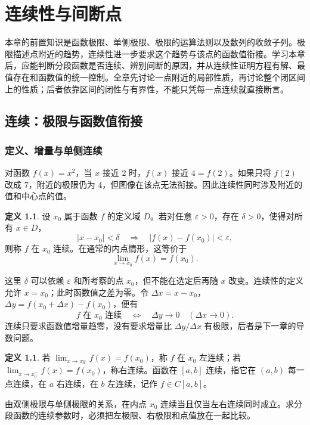 \documentclass[UTF8,fontset=fandol,12pt,oneside,openany]{ctexrep}
\theoremstyle{definition}
\newtheorem{definition}[theorem]{定义}
\begin{document}
\chapter{连续性与间断点}
\label{lec:04:chapter}

本章的前置知识是函数极限、单侧极限、极限的运算法则以及数列的收敛子列。极限描述点附近的趋势，连续性进一步要求这个趋势与该点的函数值衔接。学习本章后，应能判断分段函数是否连续、辨别间断的原因，并从连续性证明方程有解、最值存在和函数值的统一控制。全章先讨论一点附近的局部性质，再讨论整个闭区间上的性质；后者依靠区间的闭性与有界性，不能只凭每一点连续就直接断言。

\section{连续：极限与函数值衔接}
\label{lec:04:continuity}

\subsection{定义、增量与单侧连续}
对函数 $f(x)=x^2$，当 $x$ 接近 $2$ 时，$f(x)$ 接近 $4=f(2)$。如果只将 $f(2)$ 改成 $7$，附近的极限仍为 $4$，但图像在该点无法衔接。因此连续性同时涉及附近的值和中心点的值。

\begin{definition}
设 $x_0$ 属于函数 $f$ 的定义域 $D$。若对任意 $\varepsilon>0$，存在 $\delta>0$，使得对所有 $x\in D$，
\[
 |x-x_0|<\delta\quad\Longrightarrow\quad
 |f(x)-f(x_0)|<\varepsilon,
\]
则称 $f$ 在 $x_0$ 连续。在通常的内点情形，这等价于
\[
 \lim_{x\to x_0}f(x)=f(x_0).
\]
\end{definition}

这里 $\delta$ 可以依赖 $\varepsilon$ 和所考察的点 $x_0$，但不能在选定后再随 $x$ 改变。连续性的定义允许 $x=x_0$；此时函数值之差为零。令 $\Delta x=x-x_0$，$\Delta y=f(x_0+\Delta x)-f(x_0)$，便有
\[
 f\text{ 在 }x_0\text{ 连续}\quad\Longleftrightarrow\quad
 \Delta y\to0\quad(\Delta x\to0).
\]
连续只要求函数值增量趋零，没有要求增量比 $\Delta y/\Delta x$ 有极限，后者是下一章的导数问题。

\begin{definition}
若 $\lim_{x\to x_0^-}f(x)=f(x_0)$，称 $f$ 在 $x_0$ 左连续；若 $\lim_{x\to x_0^+}f(x)=f(x_0)$，称右连续。函数在 $[a,b]$ 连续，指它在 $(a,b)$ 每一点连续，在 $a$ 右连续，在 $b$ 左连续，记作 $f\in C[a,b]$。
\end{definition}

由双侧极限与单侧极限的关系，在内点 $x_0$ 连续当且仅当左右连续同时成立。求分段函数的连续参数时，必须把左极限、右极限和点值放在一起比较。
\end{document}
